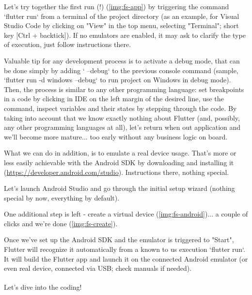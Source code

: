 Let's try together the first run (!) (\cref{img:fs-app}) by triggering the command `flutter run` from a terminal of the 
project directory (as an example, for Visual Studio Code by clicking on "View" in the top menu, selecting "Terminal"; 
short key [Ctrl + backtick]). If no emulators are enabled, it may ask to clarify the type of execution, just follow 
instructions there.

Valuable tip for any development process is to activate a debug mode, that can be done simply by adding ` --debug` to 
the previous console command (sample, `flutter run -d windows --debug` to run project on Windows in debug mode). Then, 
the process is similar to any other programming language: set breakpoints in a code by clicking in IDE on the left 
margin of the desired line, use the command, inspect variables and their states by stepping through the code. 
By taking into account that we know exactly nothing about Flutter (and, possibly, any other programming languages 
at all), let's return when out application and we'll become more mature... too early without any business logic on board.


What we can do in addition, is to emulate a real device usage. That's more or less easily achievable with the 
Android SDK by downloading and installing it 
(\href{https://developer.android.com/studio}{https://developer.android.com/studio}). Instructions there, nothing special.

Let's launch Android Studio and go through the initial setup wizard (nothing special by now, everything by default).


One additional step is left - create a virtual device (\cref{img:fs-android})... 
a couple of clicks and we're done (\cref{img:fs-create}).


Once we've set up the Android SDK and the emulator is triggered to "Start", Flutter will recognize it automatically from
a known to us execution `flutter run`. It will build the Flutter app and launch it on the connected Android 
emulator (or even real device, connected via USB; check manuals if needed).
\\
\\
Let's dive into the coding!